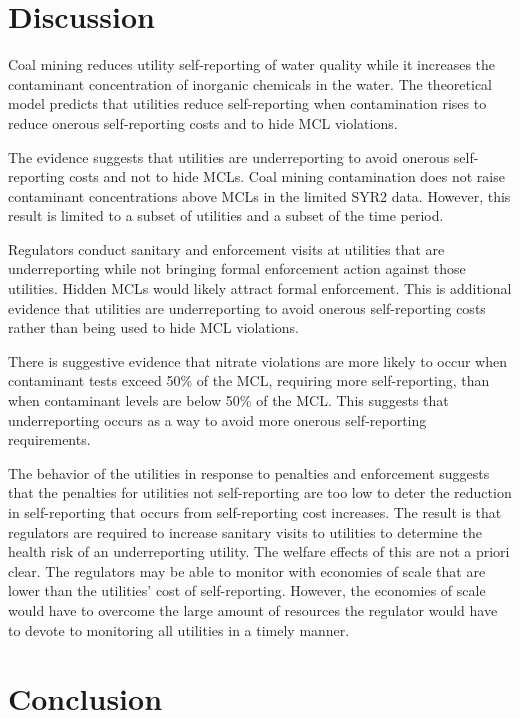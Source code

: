 \documentclass{article}
\begin{document}




\section{Discussion}

Coal mining reduces utility self-reporting of water quality while it increases the contaminant concentration of inorganic chemicals in the water. The theoretical model predicts that utilities reduce self-reporting when contamination rises to reduce onerous self-reporting costs and to hide MCL violations. 

The evidence suggests that utilities are underreporting to avoid onerous self-reporting costs and not to hide MCLs. Coal mining contamination does not raise contaminant concentrations above MCLs in the limited SYR2 data. However, this result is limited to a subset of utilities and a subset of the time period.

Regulators conduct sanitary and enforcement visits at utilities that are underreporting while not bringing formal enforcement action against those utilities. Hidden MCLs would likely attract formal enforcement. This is additional evidence that utilities are underreporting to avoid onerous self-reporting costs rather than being used to hide MCL violations.

There is suggestive evidence that nitrate violations are more likely to occur when contaminant tests exceed 50\% of the MCL, requiring more self-reporting, than when contaminant levels are below 50\% of the MCL. This suggests that underreporting occurs as a way to avoid more onerous self-reporting requirements.

The behavior of the utilities in response to penalties and enforcement suggests that the penalties for utilities not self-reporting are too low to deter the reduction in self-reporting that occurs from self-reporting cost increases. The result is that regulators are required to increase sanitary visits to utilities to determine the health risk of an underreporting utility. The welfare effects of this are not a priori clear. The regulators may be able to monitor with economies of scale that are lower than the utilities' cost of self-reporting. However, the economies of scale would have to overcome the large amount of resources the regulator would have to devote to monitoring all utilities in a timely manner.

\section{Conclusion}
\end{document}
